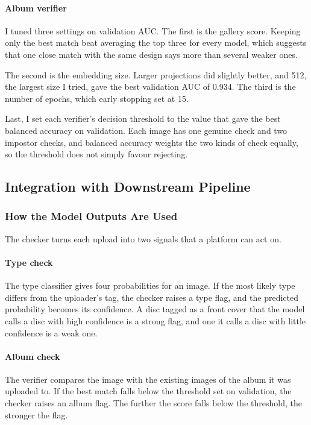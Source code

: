 \documentclass[conference]{IEEEtran}
\begin{document}
\paragraph{Album verifier} I tuned three settings on validation AUC. The first is the gallery score. Keeping only the best match beat averaging the top three for every model, which suggests that one close match with the same design says more than several weaker ones.

The second is the embedding size. Larger projections did slightly better, and 512, the largest size I tried, gave the best validation AUC of 0.934. The third is the number of epochs, which early stopping set at 15.

Last, I set each verifier's decision threshold to the value that gave the best balanced accuracy on validation. Each image has one genuine check and two impostor checks, and balanced accuracy weights the two kinds of check equally, so the threshold does not simply favour rejecting.

\subsection{Integration with Downstream Pipeline}\label{sec:integration}

\subsubsection{How the Model Outputs Are Used}\label{sec:usage}
The checker turns each upload into two signals that a platform can act on.

\paragraph{Type check} The type classifier gives four probabilities for an image. If the most likely type differs from the uploader's tag, the checker raises a type flag, and the predicted probability becomes its confidence. A disc tagged as a front cover that the model calls a disc with high confidence is a strong flag, and one it calls a disc with little confidence is a weak one.

\paragraph{Album check} The verifier compares the image with the existing images of the album it was uploaded to. If the best match falls below the threshold set on validation, the checker raises an album flag. The further the score falls below the threshold, the stronger the flag.
\end{document}
